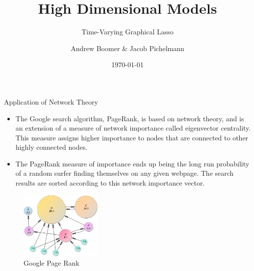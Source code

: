 \documentclass{beamer}
\title[High Dimensional Models] %
{High Dimensional Models}
\subtitle{Time-Varying Graphical Lasso}
\author[Andrew Boomer \& Jacob Pichelmann] %
{Andrew Boomer \& Jacob Pichelmann}
\institute []
{Toulouse School of Economics \\ M2 EEE}
\date{\today}
\begin{document}
\frame{\titlepage}

\begin{frame}{Application of Network Theory \cite{page1999pagerank}}
	\begin{itemize}
		\item The Google search algorithm, PageRank, is based on network theory, and is an extension of a measure of network importance called eigenvector centrality.
        This measure assigns higher importance to nodes that are connected to other highly connected nodes.
		\item The PageRank measure of importance ends up being the long run probability of a random surfer finding themselves on any given webpage.
        The search results are sorted according to this network importance vector.
	\end{itemize}

        \begin{figure}
       \includegraphics[width=4cm]{PageRankExample}
       \caption{Google Page Rank}
       \source{}
       \label{fig:PageRank}
  \end{figure}
\end{frame}
    
\end{document}
